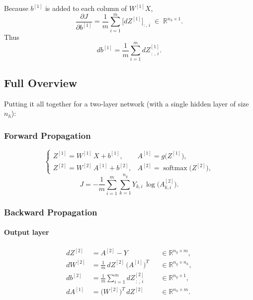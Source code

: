 \documentclass{article}
\begin{document}
Because $b^{[1]}$ is added to each column of $W^{[1]}X$,
\[
  \frac{\partial J}{\partial b^{[1]}}
    = \frac{1}{m}\sum_{i=1}^m \bigl[dZ^{[1]}\bigr]_{:,\,i}
    \;\in\; \mathbb{R}^{n_h \times 1}.
\]
Thus
\begin{equation}\label{eq:db1}
  db^{[1]} 
    = \frac{1}{m}\sum_{i=1}^m dZ^{[1]}_{\,:\,,\,i}.
\end{equation}

\bigskip
\subsection{Full Overview}

Putting it all together for a two‐layer network (with a single hidden layer of size $n_h$):

\subsubsection{Forward Propagation}
\[
\begin{cases}
  Z^{[1]} = W^{[1]}\,X + b^{[1]}, 
  & A^{[1]} = g\bigl(Z^{[1]}\bigr),\\[6pt]
  Z^{[2]} = W^{[2]}\,A^{[1]} + b^{[2]}, 
  & A^{[2]} = \operatorname{softmax}\bigl(Z^{[2]}\bigr),
\end{cases}
\]
\[
  J = -\frac{1}{m} \sum_{i=1}^m \sum_{k=1}^{n_y} 
        Y_{k,i}\,\log \bigl(A^{[2]}_{k,i}\bigr).
\]

\subsubsection{Backward Propagation}

\paragraph{Output layer}
\begin{align}
  dZ^{[2]} &= A^{[2]} - Y 
            &&\in\mathbb{R}^{n_y\times m}, \label{eq:out1}\\
  dW^{[2]} &= \frac{1}{m}\,dZ^{[2]}\,\bigl(A^{[1]}\bigr)^{T} 
            &&\in\mathbb{R}^{n_y\times n_h}, \label{eq:out2}\\
  db^{[2]} &= \frac{1}{m}\sum_{i=1}^m dZ^{[2]}_{\,:\,,\,i} 
            &&\in\mathbb{R}^{n_y\times 1}, \label{eq:out3}\\
  dA^{[1]} &= \bigl(W^{[2]}\bigr)^{T} \, dZ^{[2]}
            &&\in\mathbb{R}^{n_h\times m}. \label{eq:out4}
\end{align}
\end{document}
